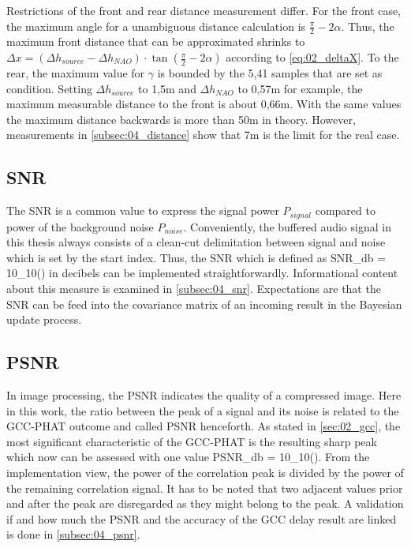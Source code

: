 Restrictions of the front and rear distance measurement differ.
For the front case, the maximum angle for a unambiguous distance calculation
is $\frac{\pi}{2}- 2\alpha$.
Thus, the maximum front distance that can be approximated shrinks to
$\Delta x = (\Delta h_{source} - \Delta h_{NAO}) \cdot \tan(\frac{\pi}{2} - 2\alpha)$
according to \cref{eq:02_deltaX}.
To the rear, the maximum value for $\gamma$ is bounded by the 5,41 samples that
are set as condition.
Setting $\Delta h_{source}$ to 1,5\si{m} and $\Delta h_{NAO}$ to 0,57\si{\meter} for example,
the maximum measurable distance to the front is about 0,66\si{\meter}.
With the same values the maximum distance backwards is more than 50\si{\meter} in theory.
However, measurements in \cref{subsec:04_distance} show that 7\si{\meter} is the
limit for the real case.


\subsection{SNR}
\label{subsec:03_snr}

The \acf{SNR} is a common value to express the signal power $P_{signal}$ compared
to power of the background noise $P_{noise}$.
Conveniently, the buffered audio signal in this thesis always consists of
a clean-cut delimitation between signal and noise which is set by the
start index.
Thus, the \ac{SNR} which is defined as
\bal
    SNR_{db} = 10\log_{10}\left(\right)
    \label{eq:03_snr}
\eal
in decibels can be implemented straightforwardly.
Informational content about this measure is examined in \cref{subsec:04_snr}.
Expectations are that the \ac{SNR} can be feed into the covariance matrix
of an incoming result in the Bayesian update process.

\subsection{PSNR}
\label{subsec:03_psnr}
In image processing, the \acf{PSNR} indicates the quality of a compressed
image. Here in this work, the ratio between the peak of a signal
and its noise is related to the \ac{GCC-PHAT} outcome and called \ac{PSNR}
henceforth.
As stated in \cref{sec:02_gcc}, the most significant characteristic
of the \ac{GCC-PHAT} is the resulting sharp peak which now can be
assessed with one value
\bal
    PSNR_{db} = 10\log_{10}\left(\right).
    \label{eq:03_psnr}
\eal
From the implementation view, the power of the correlation peak is divided by
the power of the remaining correlation signal.
It has to be noted that two adjacent values prior and after the peak
are disregarded as they might belong to the peak.
A validation if and how much the \ac{PSNR} and the accuracy of the \ac{GCC}
delay result are linked is done in \cref{subsec:04_psnr}.